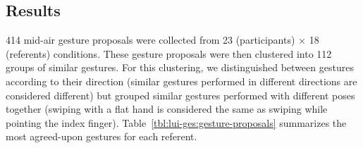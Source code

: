 

\subsection{Results} \label{app:lui-ges:results}
414 mid-air gesture proposals were collected from 23 (participants) $\times$ 18 (referents) conditions. These gesture proposals were then clustered into 112 groups of similar gestures. For this clustering, we distinguished between gestures according to their direction (\ie similar gestures performed in different directions are considered different) but grouped similar gestures performed with different poses together (\eg swiping with a flat hand is considered the same as swiping while pointing the index finger). Table~\ref{tbl:lui-ges:gesture-proposals} summarizes the most agreed-upon gestures for each referent.

